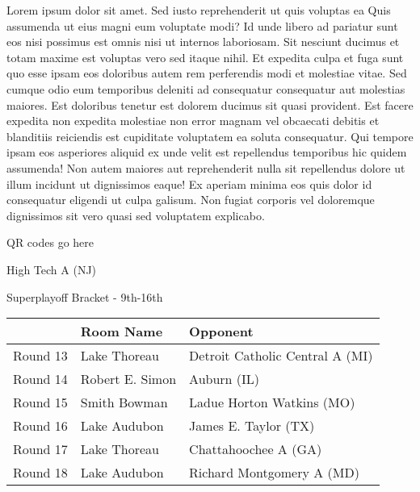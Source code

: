 \documentclass{article}%
\begin{document}
\vspace*{8pt}%
\linebreak%
\newline%
\newline%
Lorem ipsum dolor sit amet. Sed iusto reprehenderit ut quis voluptas ea Quis assumenda ut eius magni eum voluptate modi? Id unde libero ad pariatur sunt eos nisi possimus est omnis nisi ut internos laboriosam. Sit nesciunt ducimus et totam maxime est voluptas vero sed itaque nihil. Et expedita culpa et fuga sunt quo esse ipsam eos doloribus autem rem perferendis modi et molestiae vitae.\newline%
\newline%
Sed cumque odio eum temporibus deleniti ad consequatur consequatur aut molestias maiores. Est doloribus tenetur est dolorem ducimus sit quasi provident. Est facere expedita non expedita molestiae non error magnam vel obcaecati debitis et blanditiis reiciendis est cupiditate voluptatem ea soluta consequatur. Qui tempore ipsam eos asperiores aliquid ex unde velit est repellendus temporibus hic quidem assumenda!\newline%
\newline%
Non autem maiores aut reprehenderit nulla sit repellendus dolore ut illum incidunt ut dignissimos eaque! Ex aperiam minima eos quis dolor id consequatur eligendi ut culpa galisum. Non fugiat corporis vel doloremque dignissimos sit vero quasi sed voluptatem explicabo.\newline%
\newline%
%
\vspace*{30pt}%
\begin{center}%
\begin{Huge}%
QR codes go here%
\end{Huge}%
\end{center}%
\newpage%
\begin{center}%
\begin{Huge}%
High Tech A (NJ)%
\end{Huge}%
\vspace*{8pt}%
\linebreak%
\begin{Large}%
Superplayoff Bracket {-} 9th{-}16th%
\end{Large}%
\end{center}%
%
\begin{tabularx}{\textwidth}{|c|Y|Y|}%
\hline%
&Room Name&Opponent\\%
\hline%
Round 13&Lake Thoreau&Detroit Catholic Central A (MI)\\%
Round 14&Robert E. Simon&Auburn (IL)\\%
Round 15&Smith Bowman&Ladue Horton Watkins (MO)\\%
Round 16&Lake Audubon&James E. Taylor (TX)\\%
Round 17&Lake Thoreau&Chattahoochee A (GA)\\%
Round 18&Lake Audubon&Richard Montgomery A (MD)\\%
\hline%
\end{tabularx}%
\end{document}
